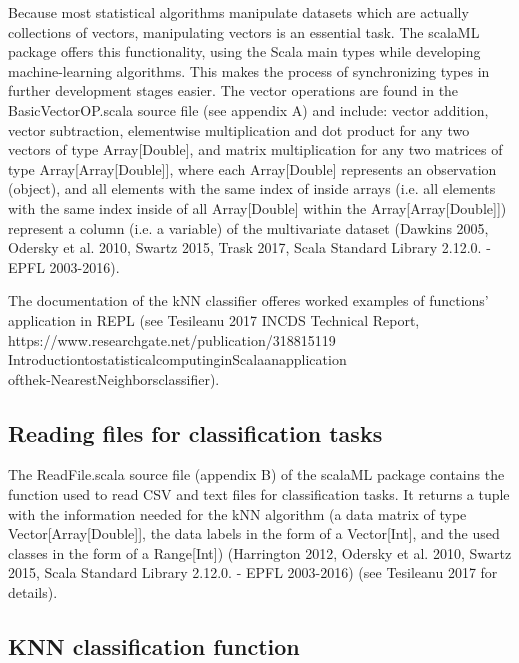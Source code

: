 \documentclass[journal]{IEEEtran}
\begin{document}
Because most statistical algorithms manipulate datasets which are actually collections of vectors, manipulating vectors is an essential task. The scalaML package offers this functionality, using the Scala main types while developing machine-learning algorithms. This makes the process of synchronizing types in further development stages easier.
 The vector operations are found in the BasicVectorOP.scala source file (see appendix A) and include: vector addition, vector subtraction, elementwise multiplication and dot product for any two vectors of type Array[Double], and matrix multiplication for any two matrices of type Array[Array[Double]], where each Array[Double] represents an observation (object), and all elements with the same index of inside arrays (i.e. all elements with the same index inside of all Array[Double] within the Array[Array[Double]]) represent a column (i.e. a variable) of the multivariate dataset (Dawkins 2005, Odersky et al. 2010, Swartz 2015, Trask 2017, Scala Standard Library 2.12.0. - EPFL 2003-2016).

The documentation of the kNN classifier offeres worked examples of functions' application in REPL (see Tesileanu 2017 INCDS Technical Report, https://www.researchgate.net/publication/318815119\underline{\space}\\Introduction\underline{\space}to\underline{\space}statistical\underline{\space}computing\underline{\space}in\underline{\space}Scala\underline{\space}an\underline{\space}application\underline{\space}\\of\underline{\space}the\underline{\space}k-Nearest\underline{\space}Neighbors\underline{\space}classifier).  

\subsection{Reading files for classification tasks}

The ReadFile.scala source file (appendix B) of the scalaML package contains the function used to read CSV and text files for classification tasks. It returns a tuple with the information needed for the kNN algorithm (a data matrix of type Vector[Array[Double]], the data labels in the form of a Vector[Int],  and the used classes in the form of a Range[Int]) (Harrington 2012, Odersky et al. 2010, Swartz 2015, Scala Standard Library 2.12.0. - EPFL 2003-2016) (see Tesileanu 2017 for details).
 
\subsection{KNN classification function}
\end{document}

